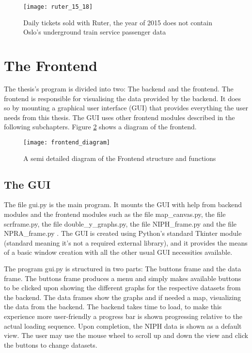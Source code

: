 \begin{figure}[!htb]
\texttt{[image: ruter\_15\_18]}
\centering
\caption{Daily tickets sold with Ruter, the year of 2015 does not contain Oslo's underground train service passenger data}
\label{fig:ruter_15_18}
\end{figure}

\newpage










\section{The Frontend}
The thesis's program is divided into two: The backend and the frontend. The frontend is responsible for visualising the data provided by the backend. It does so by mounting a graphical user interface (GUI) that provides everything the user needs from this thesis. The GUI uses other frontend modules described in the following subchapters. Figure \ref{fig:frontend_diagram} shows a diagram of the frontend.

\begin{figure}[h]
\texttt{[image: frontend\_diagram]}
\centering
\caption{A semi detailed diagram of the Frontend structure and functions}
\label{fig:frontend_diagram}
\end{figure}

\subsection{The GUI}
The file gui.py is the main program. It mounts the GUI with help from backend modules and the frontend modules such as the file map\_canvas.py, the file scrframe.py, the file double\_y\_graphs.py, the file NIPH\_frame.py and the file NPRA\_frame.py . The GUI is created using Python's standard Tkinter module (standard meaning it's not a required external library), and it provides the means of a basic window creation with all the other usual GUI necessities available. 

The program gui.py is structured in two parts: The buttons frame and the data frame. The buttons frame produces a menu and simply makes available buttons to be clicked upon showing the different graphs for the respective datasets from the backend. The data frames show the graphs and if needed a map, visualizing the data from the backend. The backend takes time to load, to make this experience more user-friendly a progress bar is shown progressing relative to the actual loading sequence. Upon completion, the NIPH data is shown as a default view. The user may use the mouse wheel to scroll up and down the view and click the buttons to change datasets. 

